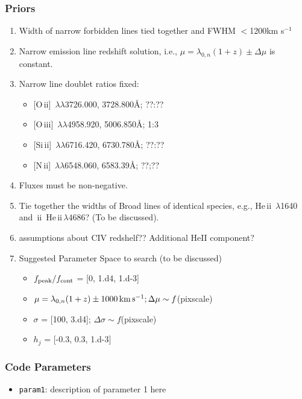 \documentclass[12pt,letterpaper]{article}
\newcommand{\HeII}{\ifmmode {\rm He}\,{\sc ii}\,\lambda4686 \else 
	           He\,{\sc ii}\,$\lambda4686$\fi}
\newcommand{\heii}{He\,{\sc ii}}
\newcommand{\nii}{N\,{\sc ii}}
\newcommand{\oii}{O\,{\sc ii}}
\newcommand{\oiii}{O\,{\sc iii}}
\newcommand{\Sizw}{Si\,{\sc ii}}
\begin{document}
\subsubsection*{Priors}

  \begin{enumerate}
    \item Width of narrow forbidden lines tied together and FWHM $<$1200km s$^{-1}$
    \item Narrow emission line redshift solution, i.e., $\mu = \lambda_{0,n}(1+z)\pm \Delta \mu$ is constant.
    \item Narrow line doublet ratios fixed:
      \begin{itemize}
        \item {[\oii]\, $\lambda \lambda$3726.000, 3728.800\AA; ??:??}
        \item {[\oiii]\, $\lambda \lambda$4958.920, 5006.850\AA;  1:3}
        \item {[\Sizw]\, $\lambda \lambda$6716.420, 6730.780\AA; ??:??}
        \item {[\nii]\, $\lambda \lambda$6548.060, 6583.39\AA; ??;??}
      \end{itemize}
    \item Fluxes must be non-negative.
    \item Tie together the widths of Broad lines of identical species, e.g., \heii\, $\lambda$1640 and \HeII?  (To be discussed).
    \item assumptions about CIV redshelf?? Additional HeII component?
    \item Suggested Parameter Space to search (to be discussed)
      \begin{itemize}
        \item $f_{\rm peak}/f_{\rm cont}$ = [0, 1.d4, 1.d-3]
        \item $\mu = \lambda_{0,n}(1+z)\pm 1000\, {\rm km}\, {\rm s}^{-1}; \Delta \mu \sim f$(pixscale)
        \item $\sigma$ = [100, 3.d4]; $\Delta \sigma \sim f$(pixscale)
        \item $h_j$ = [-0.3, 0.3, 1.d-3]
      \end{itemize}

  \end{enumerate}

\subsubsection*{Code Parameters}

\begin{itemize}
    \item {\tt param1}: description of parameter 1 here
\end{itemize}






\end{document}
